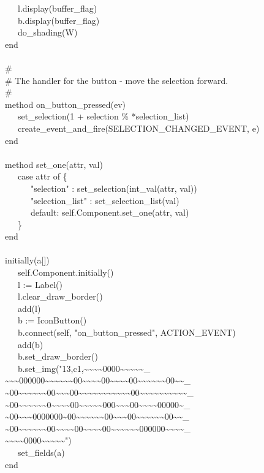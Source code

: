 {\>   \ \ \ l.display(buffer\_flag) \\
\>   \ \ \ b.display(buffer\_flag) \\
\>   \ \ \ do\_shading(W) \\
\>   end \\
\ \\
\>   \# \\
\>   \# The handler for the button - move the selection forward. \\
\>   \# \\
\>   method on\_button\_pressed(ev) \\
\>   \ \ \ set\_selection(1 + selection \% *selection\_list) \\
\>   \ \ \ create\_event\_and\_fire(SELECTION\_CHANGED\_EVENT, e) \\
\>   end \\
\ \\
\>   method set\_one(attr, val) \\
\>   \ \ \ case attr of \{ \\
\>   \ \ \ \ \ \ "selection" :
set\_selection(int\_val(attr, val)) \\
\>   \ \ \ \ \ \ "selection\_list" :
set\_selection\_list(val) \\
\>   \ \ \ \ \ \ default: self.Component.set\_one(attr, val) \\
\>   \ \ \ \} \\
\>   end \\
\ \\
\>   initially(a[])  \\
\>   \ \ \ self.Component.initially() \\
\>   \ \ \ l := Label() \\
\>   \ \ \ l.clear\_draw\_border() \\
\>   \ \ \ add(l) \\
\>   \ \ \ b := IconButton() \\
\>   \ \ \ b.connect(self,
"on\_button\_pressed", ACTION\_EVENT) \\
\>   \ \ \ add(b) \\
\>   \ \ \ b.set\_draw\_border() \\
\>   \ \ \ b.set\_img("13,c1,\~{}\~{}\~{}\~{}0000\~{}\~{}\~{}\~{}\~{}\_ \\
\>\>\~{}\~{}\~{}000000\~{}\~{}\~{}\~{}\~{}\~{}00\~{}\~{}\~{}\~{}00\~{}\~{}\~{}\~{}00\~{}\~{}\~{}\~{}\~{}\~{}00\~{}\~{}\_ \\
\>\>\~{}00\~{}\~{}\~{}\~{}\~{}\~{}00\~{}\~{}\~{}00\~{}\~{}\~{}\~{}\~{}\~{}\~{}\~{}\~{}\~{}\~{}00\~{}\~{}\~{}\~{}\~{}\~{}\~{}\~{}\~{}\~{}\_ \\
\>\>\~{}00\~{}\~{}\~{}\~{}\~{}\~{}0\~{}\~{}\~{}\~{}00\~{}\~{}\~{}\~{}\~{}000\~{}\~{}\~{}00\~{}\~{}\~{}\~{}00000\~{}\_ \\
\>\>\~{}00\~{}\~{}\~{}0000000\~{}00\~{}\~{}\~{}\~{}\~{}\~{}00\~{}\~{}\~{}00\~{}\~{}\~{}\~{}\~{}\~{}00\~{}\~{}\_ \\
\>\>\~{}00\~{}\~{}\~{}\~{}\~{}\~{}00\~{}\~{}\~{}\~{}00\~{}\~{}\~{}\~{}00\~{}\~{}\~{}\~{}\~{}\~{}000000\~{}\~{}\~{}\~{}\_ \\
\>\>\~{}\~{}\~{}\~{}0000\~{}\~{}\~{}\~{}\~{}") \\
\>   \ \ \ set\_fields(a) \\
end
}

